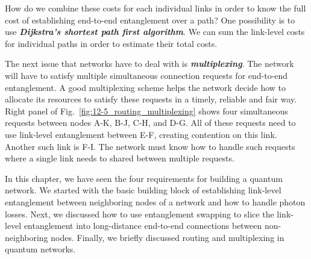 How do we combine these costs for each individual links in order to know the full cost of establishing end-to-end entanglement over a path?
One possibility is to use \textit{\textbf{Dijkstra's shortest path first algorithm}}.
We can sum the link-level costs for individual paths in order to estimate their total costs. 

The next issue that networks have to deal with is \textit{\textbf{multiplexing}}.
The network will have to satisfy multiple simultaneous connection requests for end-to-end entanglement.
A good multiplexing scheme helps the network decide how to allocate its resources to satisfy these requests in a timely, reliable and fair way.
Right panel of Fig.~\ref{fig:12-5_routing_multiplexing} shows four simultaneous requests between nodes A-K, B-J, C-H, and D-G.
All of these requests need to use link-level entanglement between E-F, creating contention on this link.
Another such link is F-I.
The network must know how to handle such requests where a single link needs to shared between multiple requests.

In this chapter, we have seen the four requirements for building a quantum network.
We started with the basic building block of establishing link-level entanglement between neighboring nodes of a network and how to handle photon losses.
Next, we discussed how to use entanglement swapping to slice the link-level entanglement into long-distance end-to-end connections between non-neighboring nodes.
Finally, we briefly discussed routing and multiplexing in quantum networks.

\newpage
\begin{exercises}


\end{exercises}

